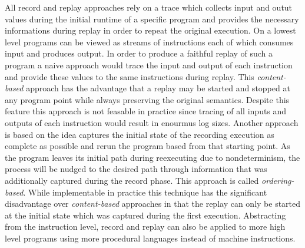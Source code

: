 \documentclass[11pt,a4paper]{book}
\begin{document}
All record and replay approaches rely on a trace which collects input and
outut values during the initial runtime of a specific program and provides
the necessary informations during replay in order to repeat the original
execution. On a lowest level programs can be viewed as streams of instructions
each of which consumes input and produces output. In order to produce a
faithful replay of such a program a naive approach would trace the input and
output of each instruction and provide these values to the same instructions
during replay. This \textit{content-based} approach has the advantage that a replay
may be started and stopped at any program point while always preserving the
original semantics. Despite this feature this approach is not feasable in
practice since tracing of all inputs and outputs of each instruction would
result in enourmus log sizes. Another approach is based on the idea captures
the initial state of the recording execution as complete as possible and rerun
the program based from that starting point. As the program leaves its initial
path during reexecuting due to nondeterminism, the process will be nudged to
the desired path through information that was additionally captured during
the record phase. This approach is called \textit{ordering-based}.
While implementable in practice this technique has the
significant disadvantage over \textit{content-based} approaches in that the replay
can only be started at the initial state which was captured during the first
execution. Abstracting from the instruction level, record and replay can also
be applied to more high level programs using more procedural languages instead
of machine instructions.
\end{document}
